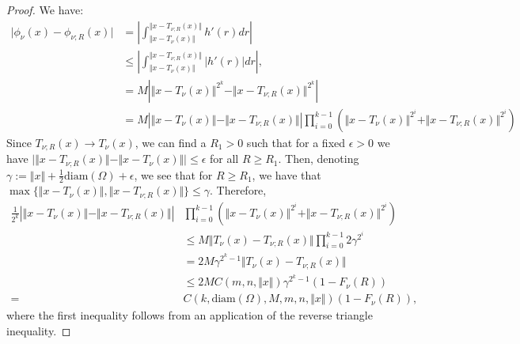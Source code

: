 \documentclass{amsart}
\theoremstyle{lemma}
\theoremstyle{remark}
\begin{document}
\begin{proof}
We have:
\begin{align}
\vert \phi_{\nu}(x) - \phi_{\nu;R}(x) \vert &= \left\vert \int_{\Vert x - T_{\nu}(x) \Vert}^{\Vert x - T_{\nu;R}(x) \Vert} h'(r) dr \right\vert \\
&\leq \left\vert \int_{\Vert x - T_{\nu}(x) \Vert}^{\Vert x - T_{\nu;R}(x) \Vert} \vert h'(r) \vert dr \right\vert, \\
&= M \left\vert \Vert x - T_{\nu}(x) \Vert^{2^{k}} - \Vert x - T_{\nu;R}(x) \Vert^{2^{k}} \right\vert \\
&= M \left\vert \Vert x - T_{\nu}(x) \Vert - \Vert x - T_{\nu;R}(x) \Vert \right\vert \prod_{i=0}^{k-1} \left( \Vert x - T_{\nu}(x) \Vert^{2^{i}} + \Vert x - T_{\nu;R}(x) \Vert^{2^{i}} \right) 
\end{align}
Since $T_{\nu;R}(x) \rightarrow T_{\nu}(x)$, we can find a $R_1>0$ such that for a fixed $\epsilon>0$ we have $\vert \Vert x - T_{\nu;R}(x) \Vert - \Vert x - T_{\nu}(x) \Vert \vert \leq \epsilon$ for all $R \geq R_1$. Then, denoting $\gamma:= \Vert x \Vert + \frac{1}{2} \text{diam}(\Omega) + \epsilon$, we see that for $R \geq R_1$, we have that $\max \{\Vert x - T_{\nu}(x) \Vert, \Vert x - T_{\nu;R}(x) \Vert \} \leq \gamma$. Therefore,
\begin{align}\label{eq:radialpotential}
\frac{1}{2^{k}} \left\vert \Vert x - T_{\nu}(x) \Vert - \Vert x - T_{\nu;R}(x) \Vert \right\vert &\prod_{i=0}^{k-1} \left( \Vert x - T_{\nu}(x) \Vert^{2^{i}} + \Vert x - T_{\nu;R}(x) \Vert^{2^{i}} \right) \\
&\leq M \Vert T_{\nu}(x) - T_{\nu;R}(x) \Vert  \prod_{i=0}^{k-1} 2 \gamma^{2^{i}} \\
&= 2M \gamma^{2^{k}-1} \Vert T_{\nu}(x) - T_{\nu;R}(x) \Vert \\
&\leq  2 M C(m, n, \Vert x \Vert) \gamma^{2^{k}-1} (1-F_{\nu}(R)) \\
=& C(k, \text{diam}(\Omega), M, m, n, \Vert x \Vert) (1-F_{\nu}(R)),
\end{align}
where the first inequality follows from an application of the reverse triangle inequality.

\end{proof}
\end{document}
